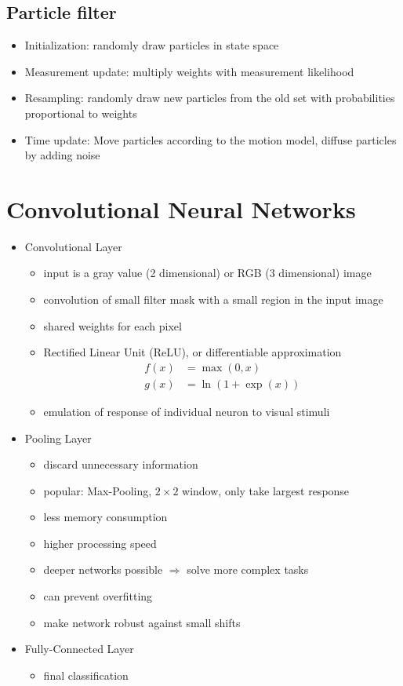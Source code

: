 \documentclass[12pt]{article}
\begin{document}
	\subsection{Particle filter}
	\begin{itemize}
		\item Initialization: randomly draw particles in state space
		\item Measurement update: multiply weights with measurement likelihood
		\item Resampling: randomly draw new particles from the old set with probabilities proportional to weights
		\item Time update: Move particles according to the motion model, diffuse particles by adding noise
	\end{itemize}

	\section{Convolutional Neural Networks}
	\begin{itemize}
		\item Convolutional Layer
			\begin{itemize}
				\item input is a gray value (2 dimensional) or RGB (3 dimensional) image
				\item convolution of small filter mask with a small region in the input image
				\item shared weights for each pixel
				\item Rectified Linear Unit (ReLU), or differentiable approximation
					\begin{align}
						f(x) &= \max(0,x) \\
						g(x) &= \ln(1 + \exp(x))
					\end{align}
				\item emulation of response of individual neuron to visual stimuli
			\end{itemize}
		\item Pooling Layer
			\begin{itemize}
				\item discard unnecessary information
				\item popular: Max-Pooling, $2\times2$ window, only take largest response
				\item less memory consumption
				\item higher processing speed
				\item deeper networks possible $\Rightarrow$ solve more complex tasks
				\item can prevent overfitting	
				\item make network robust against small shifts			
			\end{itemize}
		\item Fully-Connected Layer
			\begin{itemize}
				\item final classification
			\end{itemize}
	\end{itemize}
	
%	
%	
\end{document}
